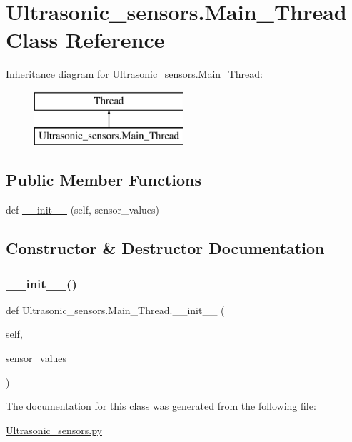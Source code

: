 \hypertarget{class_ultrasonic__sensors_1_1_main___thread}{}\section{Ultrasonic\+\_\+sensors.\+Main\+\_\+\+Thread Class Reference}
\label{class_ultrasonic__sensors_1_1_main___thread}
Inheritance diagram for Ultrasonic\+\_\+sensors.\+Main\+\_\+\+Thread\+:\begin{figure}[H]
\begin{center}
\leavevmode
\includegraphics[height=2.000000cm]{class_ultrasonic__sensors_1_1_main___thread}
\end{center}
\end{figure}
\subsection*{Public Member Functions}
\begin{DoxyCompactItemize}
\item 
def \mbox{\hyperlink{class_ultrasonic__sensors_1_1_main___thread_ad4a11271f82f2886de7e8dac7ad06455}{\+\_\+\+\_\+init\+\_\+\+\_\+}} (self, sensor\+\_\+values)
\end{DoxyCompactItemize}


\subsection{Constructor \& Destructor Documentation}
\mbox{\label{class_ultrasonic__sensors_1_1_main___thread_ad4a11271f82f2886de7e8dac7ad06455}} 
\subsubsection{\texorpdfstring{\+\_\+\+\_\+init\+\_\+\+\_\+()}{\_\_init\_\_()}}
{\footnotesize\ttfamily def Ultrasonic\+\_\+sensors.\+Main\+\_\+\+Thread.\+\_\+\+\_\+init\+\_\+\+\_\+ (\begin{DoxyParamCaption}\item[{}]{self,  }\item[{}]{sensor\+\_\+values }\end{DoxyParamCaption})}



The documentation for this class was generated from the following file\+:\begin{DoxyCompactItemize}
\item 
\mbox{\hyperlink{_ultrasonic__sensors_8py}{Ultrasonic\+\_\+sensors.\+py}}\end{DoxyCompactItemize}
